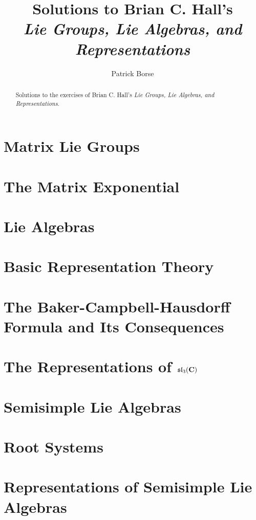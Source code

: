 \documentclass[oneside]{amsbook}
\title{Solutions to Brian C. Hall's\\ \emph{Lie Groups, Lie Algebras, and Representations}}
\author{Patrick Borse}
\begin{document}
\begin{abstract}
Solutions to the exercises of Brian C. Hall's \emph{Lie Groups, Lie Algebras, and Representations}.
\end{abstract}

\maketitle

\tableofcontents

\chapter{Matrix Lie Groups}


\chapter{The Matrix Exponential}


\chapter{Lie Algebras}


\chapter{Basic Representation Theory}


\chapter{The Baker-Campbell-Hausdorff Formula and Its Consequences}


\chapter{The Representations of $\mathfrak{sl}_3(\mathbf{C})$}


\chapter{Semisimple Lie Algebras}


\chapter{Root Systems}


\chapter{Representations of Semisimple Lie Algebras}

\end{document}
